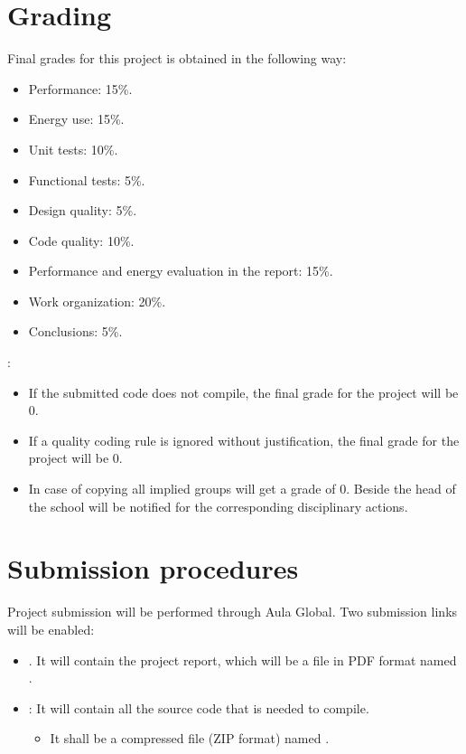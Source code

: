 \section{Grading}

Final grades for this project is obtained in the following way:

\begin{itemize}
  \item Performance: 15\%.
  \item Energy use: 15\%.
  \item Unit tests: 10\%.
  \item Functional tests: 5\%.
  \item Design quality: 5\%.
  \item Code quality: 10\%.
  \item Performance and energy evaluation in the report: 15\%.
  \item Work organization: 20\%.
  \item Conclusions: 5\%.  
\end{itemize}

:

\begin{itemize}
  \item If the submitted code does not compile, 
        the final grade for the project will be 0.

  \item If a quality coding rule is ignored without justification,
        the final grade for the project will be 0.
        
  \item In case of copying all implied groups will get a grade of 0.
        Beside the head of the school will be notified for
        the corresponding disciplinary actions.
\end{itemize}

\section{Submission procedures}

Project submission will be performed through Aula Global.
Two submission links will be enabled:

\begin{itemize}

\item {}. 
      It will contain the project report,
      which will be a file in PDF format named .

\item {}: 
      It will contain all the source code that is needed to compile.
\begin{itemize}
  \item It shall be a compressed file (ZIP format) named
        .
\end{itemize}

\end{itemize}

